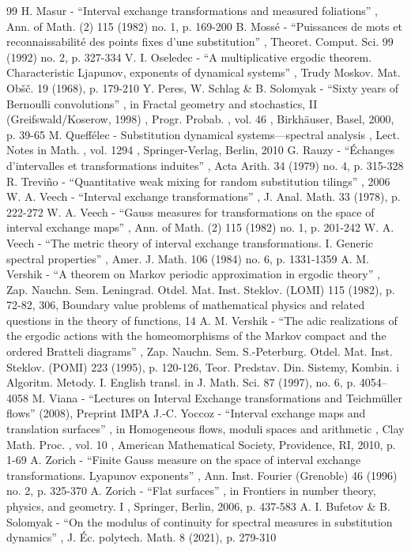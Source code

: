 \documentclass[11pt]{article}
\numberwithin{equation}{section}\newcommand{\Relation}[2][]{}\newtheorem*{prop*}{Proposition}
\begin{document}
\begin{thebibliography}{99}
 H. Masur - “Interval exchange transformations and measured foliations” , Ann. of Math. (2) 115 (1982) no. 1, p. 169-200
 B. Mossé - “Puissances de mots et reconnaissabilité des points fixes d’une substitution” , Theoret. Comput. Sci. 99 (1992) no. 2, p. 327-334
 V. I. Oseledec - “A multiplicative ergodic theorem. Characteristic Ljapunov, exponents of dynamical systems” , Trudy Moskov. Mat. Obšč. 19 (1968), p. 179-210
 Y. Peres, W. Schlag \& B. Solomyak - “Sixty years of Bernoulli convolutions” , in Fractal geometry and stochastics, II (Greifswald/Koserow, 1998) , Progr. Probab. , vol. 46 , Birkhäuser, Basel, 2000, p. 39-65
 M. Queffélec - Substitution dynamical systems—spectral analysis , Lect. Notes in Math. , vol. 1294 , Springer-Verlag, Berlin, 2010
 G. Rauzy - “Échanges d’intervalles et transformations induites” , Acta Arith. 34 (1979) no. 4, p. 315-328
 R. Treviño - “Quantitative weak mixing for random substitution tilings” , 2006
 W. A. Veech - “Interval exchange transformations” , J. Anal. Math. 33 (1978), p. 222-272
 W. A. Veech - “Gauss measures for transformations on the space of interval exchange maps” , Ann. of Math. (2) 115 (1982) no. 1, p. 201-242
 W. A. Veech - “The metric theory of interval exchange transformations. I. Generic spectral properties” , Amer. J. Math. 106 (1984) no. 6, p. 1331-1359
 A. M. Vershik - “A theorem on Markov periodic approximation in ergodic theory” , Zap. Nauchn. Sem. Leningrad. Otdel. Mat. Inst. Steklov. (LOMI) 115 (1982), p. 72-82, 306, Boundary value problems of mathematical physics and related questions in the theory of functions, 14
 A. M. Vershik - “The adic realizations of the ergodic actions with the homeomorphisms of the Markov compact and the ordered Bratteli diagrams” , Zap. Nauchn. Sem. S.-Peterburg. Otdel. Mat. Inst. Steklov. (POMI) 223 (1995), p. 120-126, Teor. Predstav. Din. Sistemy, Kombin. i Algoritm. Metody. I. English transl. in J. Math. Sci. 87 (1997), no. 6, p. 4054–4058
 M. Viana - “Lectures on Interval Exchange transformations and Teichmüller flows” (2008), Preprint IMPA
 J.-C. Yoccoz - “Interval exchange maps and translation surfaces” , in Homogeneous flows, moduli spaces and arithmetic , Clay Math. Proc. , vol. 10 , American Mathematical Society, Providence, RI, 2010, p. 1-69
 A. Zorich - “Finite Gauss measure on the space of interval exchange transformations. Lyapunov exponents” , Ann. Inst. Fourier (Grenoble) 46 (1996) no. 2, p. 325-370
 A. Zorich - “Flat surfaces” , in Frontiers in number theory, physics, and geometry. I , Springer, Berlin, 2006, p. 437-583
 A. I. Bufetov \& B. Solomyak - “On the modulus of continuity for spectral measures in substitution dynamics” , J. Éc. polytech. Math. 8 (2021), p. 279-310
\end{thebibliography}
\end{document}
